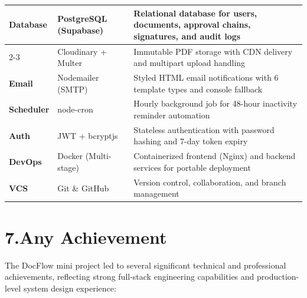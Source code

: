 \documentclass[12pt,a4paper]{report}
\begin{document}
\begin{table}[h!]
\begin{tabularx}{\textwidth}{|p{2.2cm}|p{4cm}|X|}
\multirow{2}{*}{\textbf{Database}}
& PostgreSQL (Supabase)
& Relational database for users, documents, approval chains, signatures, and audit logs \\
\cline{2-3}
& Cloudinary + Multer
& Immutable PDF storage with CDN delivery and multipart upload handling \\
\hline

\textbf{Email}
& Nodemailer (SMTP)
& Styled HTML email notifications with 6 template types and console fallback \\
\hline

\textbf{Scheduler}
& node-cron
& Hourly background job for 48-hour inactivity reminder automation \\
\hline

\textbf{Auth}
& JWT + bcryptjs
& Stateless authentication with password hashing and 7-day token expiry \\
\hline

\textbf{DevOps}
& Docker (Multi-stage)
& Containerized frontend (Nginx) and backend services for portable deployment \\
\hline

\textbf{VCS}
& Git \& GitHub
& Version control, collaboration, and branch management \\
\hline

\end{tabularx}
\end{table}

\chapter*{7.\quad Any Achievement}

The DocFlow mini project led to several significant technical and professional achievements, reflecting strong full-stack engineering capabilities and production-level system design experience:
\end{document}

